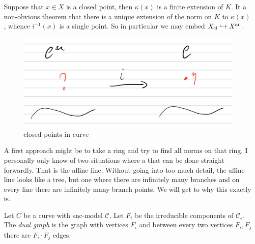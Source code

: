 \documentclass[a4paper]{article}
\begin{document}
Suppose that $x \in X$ is a closed point, then $\kappa(x)$ is a finite extension of $K$.
It a non-obvious theorem that there is a unique extension of the norm on $K$ to $\kappa(x)$, whence $i^{-1}(x)$ is a single point.
So in particular we may embed $X_{cl} \hookrightarrow X{}^{\text{an}}$.  

\begin{figure}[H]
    \centering
    \includegraphics[width = .7\textwidth]{figures/closed-points-in-curve.png}
    \caption{closed points in curve}
    \label{fig:closed-points-in-curve}
\end{figure}

A first approach might be to take a ring and try to find all norms on that ring. 
I personally only know of two situations where a that can be done straight forwardly.
That is the affine line. 
Without going into too much detail, the affine line looks like a tree, but one where there are infinitely many branches and on every line there are infinitely many branch points. 
We will get to why this exactly is. 


\begin{definition}
	Let $C$ be a curve with snc-model $\mathcal{C} $. 
	Let $F_i$ be the irreducible components of $\mathcal{C} _s$. 
	The \emph{dual graph} is the graph with vertices $F_i$ and between every two vertices $F_i, F_j$ there are $F_i\cdot F_j$ edges. 
\end{definition}
 
\end{document}
